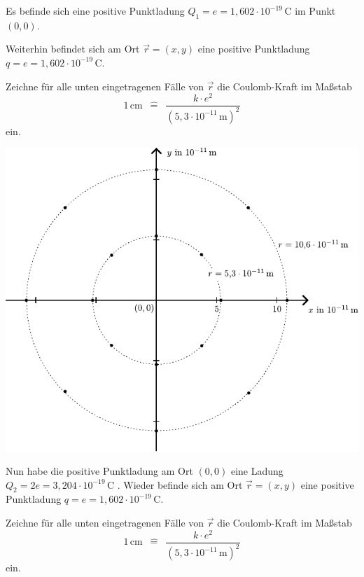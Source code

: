 \documentclass[task=1]{exercise}
\renewcommand{\vec}{\overrightarrow}
\begin{document}
  Es befinde sich eine positive Punktladung $Q_1 = e = 1,602 \cdot 10^{-19}\,\mathrm{C}$ im Punkt $(0,0)$.

  Weiterhin befindet sich am Ort $\vec{r} = (x,y)$ eine positive Punktladung $q = e = 1,602 \cdot 10^{-19}\,\mathrm{C}$.
  
  Zeichne f\"ur alle unten eingetragenen F\"alle von $\vec{r}$ die Coulomb-Kraft im Ma{\ss}stab
  \begin{equation}
    1\,\mathrm{cm} \,\,\, \hat{=}\,\,\, \frac{k\cdot e^2}{\left( 5{,}3\cdot 10^{-11}\, \mathrm{m} \right)^2}
  \end{equation}
  ein.
  
  \vspace{2cm}
  
  \begin{center}
   \includegraphics{images/diagram.pdf}
  \end{center}



\newpage
  
    Nun habe die positive Punktladung am Ort $(0,0)$ eine Ladung $Q_2 = 2e = 3,204 \cdot 10^{-19}\,\mathrm{C}$ .
  Wieder befinde sich am Ort $\vec{r} = (x,y)$ eine positive Punktladung $q = e = 1,602 \cdot 10^{-19}\,\mathrm{C}$.
  
  Zeichne f\"ur alle unten eingetragenen F\"alle von $\vec{r}$ die Coulomb-Kraft im Ma{\ss}stab
  \begin{equation}
    1\,\mathrm{cm} \,\,\, \hat{=}\,\,\, \frac{k\cdot e^2}{\left( 5{,}3\cdot 10^{-11}\, \mathrm{m} \right)^2}
  \end{equation}
  ein.
  
\end{document}
